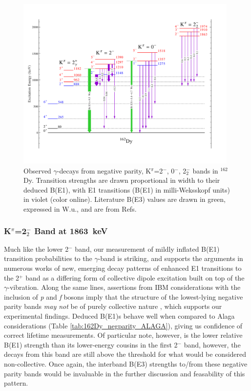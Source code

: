 \begin{figure}[h]
\begin{center}
\includegraphics[width=0.98\textwidth]{162Dy_negparity_202.pdf}
\caption{Observed $\gamma$-decays from negative parity, K$^\pi$=2$^-$, 0$^-$, 2$^-_2$ bands in $^{162}$Dy. Transition strengths are drawn proportional in width to their deduced B(E1), with E1 transitions (B(E1) in milli-Weksskopf units) in violet (color online). Literature B(E3) values are drawn in green, expressed in W.u., and are from Refs. \cite{McGowan_BE2_1981,OEHLBERG_BE3} \label{fig:162Dy_negparity_202}}
\end{center}
\end{figure}

\subsubsection{K$^\pi$=2$^-_2$ Band at 1863~keV}

Much like the lower 2$^-$ band, our measurement of mildly inflated B(E1) transition probabilities to the $\gamma$-band is striking, and supports the arguments in numerous works of new, emerging decay patterns \cite{Pascu_octupole_2015,Chakraborty_negparity2012,Spiecker_E1strength} of enhanced E1 transitions to the 2$^+$ band as a differing form of collective dipole excitation built on top of the $\gamma$-vibration. Along the same lines, assertions from IBM considerations with the inclusion of \textit{p} and \textit{f} bosons imply that the structure of the lowest-lying negative parity bands \textit{may not} be of purely collective nature  \cite{Aprahamian200642, Iachello_Arima_IBM}, which supports our experimental findings. Deduced B(E1)s behave well when compared to Alaga considerations (Table \ref{tab:162Dy_negparity_ALAGA}), giving us confidence of correct lifetime measurements. Of particular note, however, is the lower relative B(E1) strength than its lower-energy cousins in the first 2$^-$ band, however, the decays from this band are still above the threshold for what would be considered non-collective. Once again, the interband B(E3) strengths to/from these negative parity bands would be invaluable in the further discussion and feasability of this pattern.

